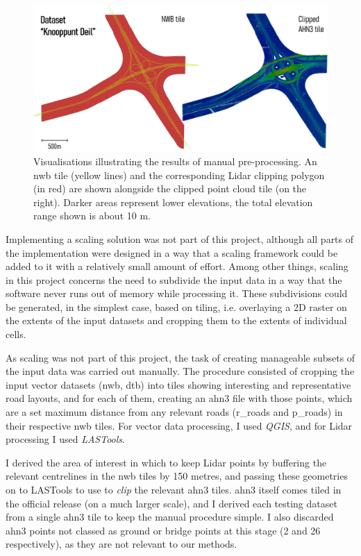 \begin{figure}
    \centering
    \includegraphics[width=\linewidth]{final_report/figs/manualpreprocessing.png}
    \caption[Visualisations illustrating the results of manual pre-processing]{Visualisations illustrating the results of manual pre-processing. An \ac{nwb} tile (yellow lines) and the corresponding Lidar clipping polygon (in red) are shown alongside the clipped point cloud tile (on the right). Darker areas represent lower elevations, the total elevation range shown is about 10 m.}
    \label{fig:manualpreprocessing}
\end{figure}

Implementing a scaling solution was not part of this project, although all parts of the implementation were designed in a way that a scaling framework could be added to it with a relatively small amount of effort. Among other things, scaling in this project concerns the need to subdivide the input data in a way that the software never runs out of memory while processing it. These subdivisions could be generated, in the simplest case, based on tiling, i.e. overlaying a 2D raster on the extents of the input datasets and cropping them to the extents of individual cells.

As scaling was not part of this project, the task of creating manageable subsets of the input data was carried out manually. The procedure consisted of cropping the input vector datasets (\ac{nwb}, \ac{dtb}) into tiles showing interesting and representative road layouts, and for each of them, creating an \ac{ahn3} file with those points, which are a set maximum distance from any relevant roads (\ac{r_roads} and \ac{p_roads}) in their respective \ac{nwb} tiles. For vector data processing, I used \textit{QGIS}, and for Lidar processing I used \textit{LASTools}.

I derived the area of interest in which to keep Lidar points by buffering the relevant centrelines in the \ac{nwb} tiles by 150 metres, and passing these geometries on to LASTools to use to \textit{clip} the relevant \ac{ahn3} tiles. \ac{ahn3} itself comes tiled in the official release (on a much larger scale), and I derived each testing dataset from a single \ac{ahn3} tile to keep the manual procedure simple. I also discarded \ac{ahn3} points not classed as ground or bridge points at this stage (2 and 26 respectively), as they are not relevant to our methods.


